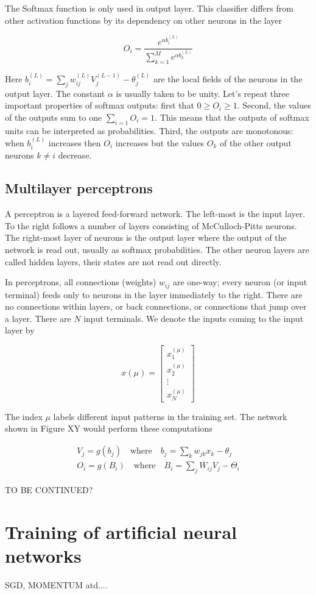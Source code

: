 \begin{itemize}
The Softmax function is only used in output layer. This classifier differs from other activation functions by its dependency on other neurons in the layer

$$  
O_{i} = \frac{e^{\alpha b_i^{(L)}}}{\sum_{k=1}^{M} e^{\alpha b_k^{(L)}}}
$$

Here $ b_{i}^{(L)} = \sum_{j}w_{ij}^{(L)} V_{j}^{(L-1)} - \theta _{j}^{(L)} $  are the local fields of the neurons in the output layer. The constant $\alpha$ is usually taken to be unity. Let's repeat three important properties of softmax outputs: first that 
$ 0 \geq O_i \geq 1 $. Second, the values of the outputs sum to one $ \sum_{i=1} O_i = 1 $. This means that the outputs of softmax units can be interpreted as probabilities. Third, the outputs are monotonous: when $ b_i^{(L)} $ increases then $ O_i $ increases but the values $ O_k $ of the other output neurons $ k \neq i $ decrease.

\end{itemize}

\subsection{Multilayer perceptrons}

A perceptron is a layered feed-forward network. The left-most is the input layer. To the right follows a number of layers consisting of McCulloch-Pitts neurons. The right-most layer of neurons is the output layer where the output of the network is read out, usually as softmax probabilities. The other neuron layers are called hidden layers, their states are not read out directly. 

In perceptrons, all connections (weights) $ w_{ij} $ are one-way; every neuron (or input terminal) feeds only to neurons in the layer immediately to the right. There are no connections within layers, or back connections, or connections that jump over a layer. There are $ N $ input terminals. We denote the inputs coming to the input layer by

$$ x(\mu)= 
\begin{bmatrix}
x_{1}^{(\mu)} \\
x_{2}^{(\mu)} \\
\vdots \\
x_{N}^{(\mu)} 
\end{bmatrix}
$$

The index $ \mu $ labels different input patterns in the training set. The network shown in Figure XY would perform these computations

\begin{gather}
V_j = g(b_j) \quad \text{where} \quad b_j = \sum_{k} w_{jk} x_{k} - \theta_{j} \\
O_i = g(B_i) \quad \text{where} \quad B_i = \sum_{j} W_{ij} V_{j} - \Theta_{i} 
\end{gather}

TO BE CONTINUED?


\section{Training of artificial neural networks}

SGD, MOMENTUM atd....



